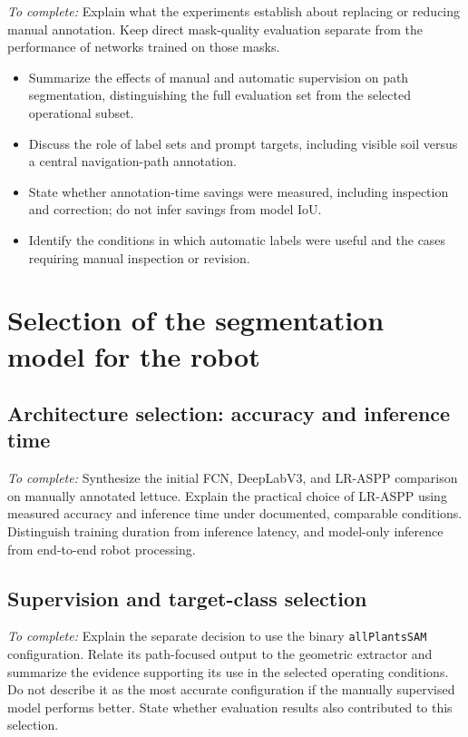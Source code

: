 \emph{To complete:} Explain what the experiments establish about replacing
or reducing manual annotation. Keep direct mask-quality evaluation
separate from the performance of networks trained on those masks.
\begin{itemize}
    \item Summarize the effects of manual and automatic supervision on
    path segmentation, distinguishing the full evaluation set from the
    selected operational subset.
    \item Discuss the role of label sets and prompt targets, including
    visible soil versus a central navigation-path annotation.
    \item State whether annotation-time savings were measured, including
    inspection and correction; do not infer savings from model IoU.
    \item Identify the conditions in which automatic labels were useful
    and the cases requiring manual inspection or revision.
\end{itemize}

\section{Selection of the segmentation model for the robot}
\label{sec:c6_segmentation_selection}

\subsection{Architecture selection: accuracy and inference time}
\label{subsec:c6_architecture_selection}

\emph{To complete:} Synthesize the initial FCN, DeepLabV3, and LR-ASPP
comparison on manually annotated lettuce. Explain the practical choice
of LR-ASPP using measured accuracy and inference time under documented,
comparable conditions. Distinguish training duration from inference
latency, and model-only inference from end-to-end robot processing.

\subsection{Supervision and target-class selection}
\label{subsec:c6_supervision_selection}

\emph{To complete:} Explain the separate decision to use the binary
\texttt{allPlantsSAM} configuration. Relate its path-focused output to
the geometric extractor and summarize the evidence supporting its use
in the selected operating conditions. Do not describe it as the most
accurate configuration if the manually supervised model performs better.
State whether evaluation results also contributed to this selection.

